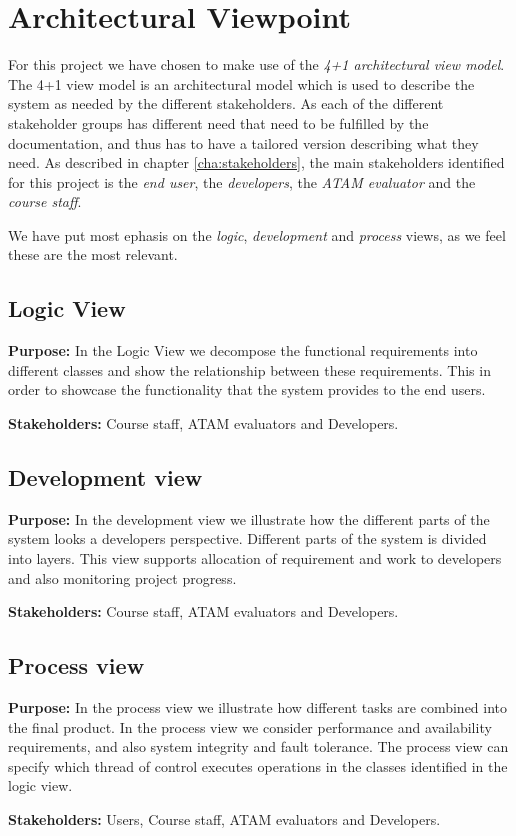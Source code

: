 \chapter{Architectural Viewpoint}
\label{cha:architectural_viewpoint}
For this project we have chosen to make use of the \emph{4+1 architectural view model}. The 4+1 view model is an architectural model which is used to describe the system as needed by the different stakeholders. As each of the different stakeholder groups has different need that need to be fulfilled by the documentation, and thus has to have a tailored version describing what they need. As described in chapter \ref{cha:stakeholders}, the main stakeholders identified for this project is the \emph{end user}, the \emph{developers}, the \emph{ATAM evaluator} and the \emph{course staff}.


We have put most ephasis on the \emph{logic}, \emph{development} and \emph{process} views, as we feel these are the most relevant.


    \section{Logic View}
    \textbf{Purpose:} In the Logic View we decompose the functional requirements into different classes and show the relationship between these requirements. This in order to showcase the functionality that the system provides to the end users.    
    
    \noindent\textbf{Stakeholders:} Course staff, ATAM evaluators and Developers.
    


    \section{Development view}
    \textbf{Purpose:} In the development view we illustrate how the different parts of the system looks a developers perspective. Different parts of the system is divided into layers. This view supports allocation of requirement and work to developers and also monitoring project progress.  
    
    \noindent\textbf{Stakeholders:} Course staff, ATAM evaluators and Developers.
    
    

    \section{Process view}
    \noindent\textbf{Purpose:} In the process view we illustrate how different tasks are combined into the final product. In the process view we consider performance and availability requirements, and also system integrity and fault tolerance.
    The process view can specify which thread of control executes operations in the classes identified in the logic view. 

    \noindent\textbf{Stakeholders:} Users, Course staff, ATAM evaluators and Developers.
    

